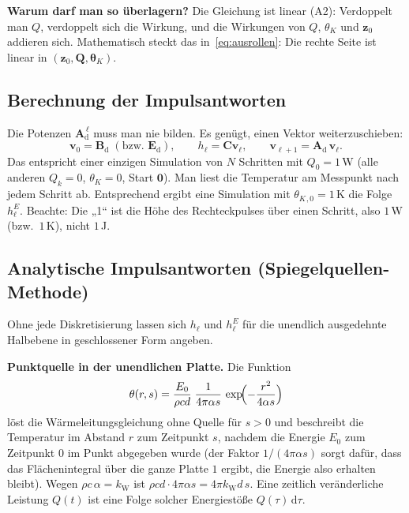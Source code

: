 \documentclass[11pt,a4paper]{article}
\numberwithin{equation}{section}
\newcommand{\dd}{\mathrm{d}}
\newcommand{\kW}{k_{\mathrm W}}
\newcommand{\thK}{\theta_{K}}
\newcommand{\vthK}{\symbf{\theta}_{K}}
\newcommand{\mC}{\mathbf{C}}
\newcommand{\mAd}{\mathbf{A}_{\mathrm d}}
\newcommand{\mBd}{\mathbf{B}_{\mathrm d}}
\newcommand{\mEd}{\mathbf{E}_{\mathrm d}}
\newcommand{\vz}{\mathbf{z}}
\newcommand{\vQ}{\mathbf{Q}}
\newcommand{\vv}{\mathbf{v}}
\begin{document}
\textbf{Warum darf man so überlagern?} Die Gleichung ist linear (A2): Verdoppelt man $Q$, verdoppelt sich die Wirkung, und die Wirkungen von $Q$, $\thK$ und $\vz_0$ addieren sich. Mathematisch steckt das in~\eqref{eq:ausrollen}: Die rechte Seite ist linear in $(\vz_0,\vQ,\vthK)$.

\subsection{Berechnung der Impulsantworten}

Die Potenzen $\mAd^{\,\ell}$ muss man nie bilden. Es genügt, einen Vektor weiterzuschieben:
\begin{equation}
 \vv_0=\mBd\;(\text{bzw. }\mEd),\qquad h_\ell=\mC\vv_\ell,\qquad \vv_{\ell+1}=\mAd\,\vv_\ell .
\end{equation}
Das entspricht einer einzigen Simulation von $N$ Schritten mit $Q_0=1$\,W (alle anderen $Q_k=0$, $\thK=0$, Start $\mathbf0$). Man liest die Temperatur am Messpunkt nach jedem Schritt ab. Entsprechend ergibt eine Simulation mit $\thK{}_{,0}=1$\,K die Folge $h^E_\ell$. Beachte: Die „1“ ist die Höhe des Rechteckpulses über einen Schritt, also $1$\,W (bzw.\ $1$\,K), nicht $1$\,J.

\subsection{Analytische Impulsantworten (Spiegelquellen-Methode)}
\label{sec:analytisch}

Ohne jede Diskretisierung lassen sich $h_\ell$ und $h^E_\ell$ für die unendlich ausgedehnte Halbebene in geschlossener Form angeben.

\textbf{Punktquelle in der unendlichen Platte.} Die Funktion
\begin{equation}
 \theta(r,s)=\frac{E_0}{\rho c d}\;\frac{1}{4\pi\alpha s}\,\exp\!\Bigl(-\frac{r^2}{4\alpha s}\Bigr)
\end{equation}
löst die Wärmeleitungsgleichung ohne Quelle für $s>0$ und beschreibt die Temperatur im Abstand $r$ zum Zeitpunkt $s$, nachdem die Energie $E_0$ zum Zeitpunkt $0$ im Punkt abgegeben wurde (der Faktor $1/(4\pi\alpha s)$ sorgt dafür, dass das Flächenintegral über die ganze Platte $1$ ergibt, die Energie also erhalten bleibt). Wegen $\rho c\,\alpha=\kW$ ist $\rho c d\cdot4\pi\alpha s=4\pi\kW d\,s$. Eine zeitlich veränderliche Leistung $Q(t)$ ist eine Folge solcher Energiestöße $Q(\tau)\,\dd\tau$.
\end{document}
